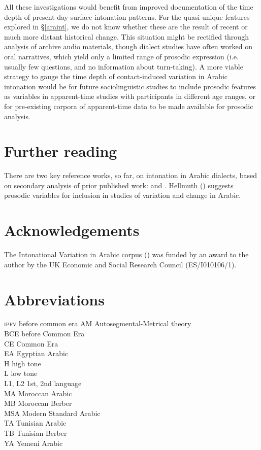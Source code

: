 \documentclass[output=paper]{langsci/langscibook}
\begin{document}
All these investigations would benefit from improved documentation of the time depth of present-day surface intonation patterns. For the quasi-unique features explored in §\ref{araint}, we do not know whether these are the result of recent or much more distant historical change. This situation might be rectified through analysis of archive audio materials, though dialect studies have often worked on oral narratives, which yield only a limited range of prosodic expression (i.e. usually few questions, and no information about turn-taking). A more viable strategy to gauge the time depth of contact-induced variation in Arabic intonation would be for future sociolinguistic studies to include prosodic features as variables in apparent-time studies with participants in different age ranges, or for pre-existing corpora of apparent-time data to be made available for prosodic analysis.

\section*{Further reading}

There are two key reference works, so far, on intonation in Arabic dialects, based on secondary analysis of prior published work: \citet{Chahal2011} and \citet{ElZarka2017}. Hellmuth (\citeyear{Hellmuth2019}) suggests prosodic variables for inclusion in studies of variation and change in Arabic. 

\section*{Acknowledgements}

The Intonational Variation in Arabic corpus (\citealt{HellmuthAlmbark2017}) was funded by an award to the author by the UK Economic and Social Research Council (ES/I010106/1).

\section*{Abbreviations}
\setlength{\columnsep}{30pt}
\begin{multicols}{2}
\begin{tabbing}
\textsc{ipfv} \hspace{1em} \= before common era\kill
AM \> Autosegmental-Metrical theory \hspace{10mm} \\
BCE \> before Common Era \\
CE \> Common Era \\
EA \> Egyptian Arabic \\
H \> high tone \\
L \> low tone \\
L1, L2 \> 1st, 2nd language \\
MA \> Moroccan Arabic \\
MB \> Moroccan Berber \\
MSA \> Modern Standard Arabic \\
TA \> Tunisian Arabic \\
TB \> Tunisian Berber \\
YA \> Yemeni Arabic
\end{tabbing}
\end{multicols}

\sloppy
\printbibliography[heading=subbibliography,notkeyword=this]
\end{document}
